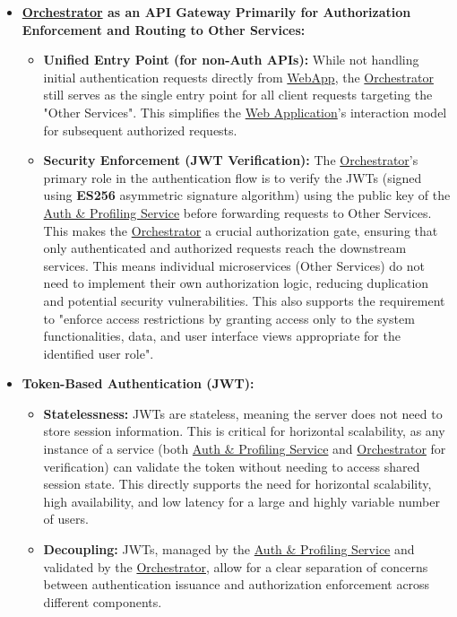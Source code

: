 \begin{itemize}
    \item \textbf{\hyperref[def:Orchestrator]{Orchestrator} as an API Gateway Primarily for Authorization Enforcement and Routing to Other Services:}
    \begin{itemize}
        \item \textbf{Unified Entry Point (for non-Auth APIs):} While not handling initial authentication requests directly from \hyperref[def:WebApplication]{WebApp}, the \hyperref[def:Orchestrator]{Orchestrator} still serves as the single entry point for all client requests targeting the "Other Services". This simplifies the \hyperref[def:WebApplication]{Web Application}'s interaction model for subsequent authorized requests.
        
        \item \textbf{Security Enforcement (JWT Verification):} The \hyperref[def:Orchestrator]{Orchestrator}'s primary role in the authentication flow is to verify the JWTs (signed using \textbf{ES256} asymmetric signature algorithm) using the public key of the   \hyperref[def:AuthProfilingService]{Auth \& Profiling Service} before forwarding requests to Other Services. This makes the \hyperref[def:Orchestrator]{Orchestrator} a crucial authorization gate, ensuring that only authenticated and authorized requests reach the downstream services. This means individual microservices (Other Services) do not need to implement their own authorization logic, reducing duplication and potential security vulnerabilities. This also supports the requirement to "enforce access restrictions by granting access only to the system functionalities, data, and user interface views appropriate for the identified user role".
    \end{itemize}

    \item \textbf{Token-Based Authentication (JWT):}
    \begin{itemize}
        \item \textbf{Statelessness:} JWTs are stateless, meaning the server does not need to store session information. This is critical for horizontal scalability, as any instance of a service (both \hyperref[def:AuthProfilingService]{Auth \& Profiling Service} and \hyperref[def:Orchestrator]{Orchestrator} for verification) can validate the token without needing to access shared session state. This directly supports the need for horizontal scalability, high availability, and low latency for a large and highly variable number of users.
        \item \textbf{Decoupling:} JWTs, managed by the \hyperref[def:AuthProfilingService]{Auth \& Profiling Service} and validated by the \hyperref[def:Orchestrator]{Orchestrator}, allow for a clear separation of concerns between authentication issuance and authorization enforcement across different components.
    \end{itemize}


\end{itemize}
